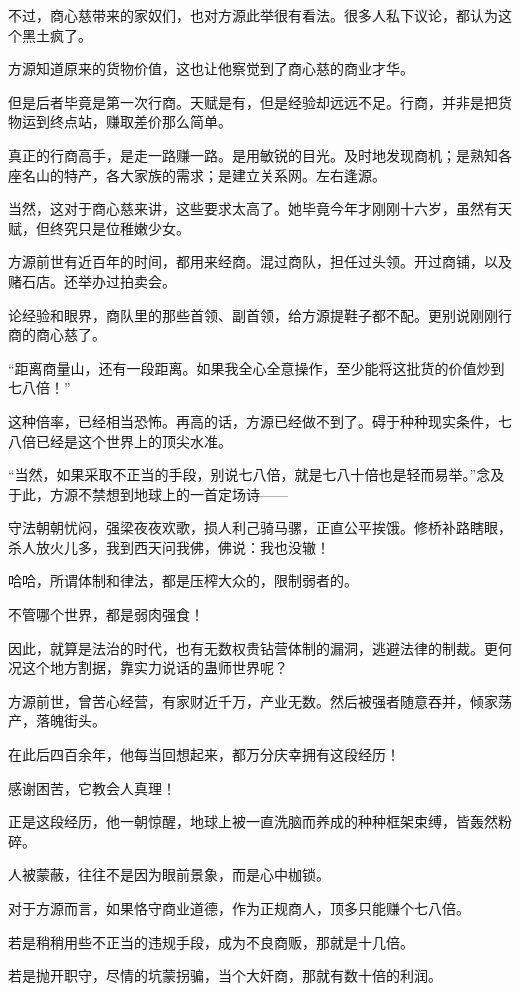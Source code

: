 \begin{this_body}
不过，商心慈带来的家奴们，也对方源此举很有看法。很多人私下议论，都认为这个黑土疯了。

方源知道原来的货物价值，这也让他察觉到了商心慈的商业才华。

但是后者毕竟是第一次行商。天赋是有，但是经验却远远不足。行商，并非是把货物运到终点站，赚取差价那么简单。

真正的行商高手，是走一路赚一路。是用敏锐的目光。及时地发现商机；是熟知各座名山的特产，各大家族的需求；是建立关系网。左右逢源。

当然，这对于商心慈来讲，这些要求太高了。她毕竟今年才刚刚十六岁，虽然有天赋，但终究只是位稚嫩少女。

方源前世有近百年的时间，都用来经商。混过商队，担任过头领。开过商铺，以及赌石店。还举办过拍卖会。

论经验和眼界，商队里的那些首领、副首领，给方源提鞋子都不配。更别说刚刚行商的商心慈了。

“距离商量山，还有一段距离。如果我全心全意操作，至少能将这批货的价值炒到七八倍！”

这种倍率，已经相当恐怖。再高的话，方源已经做不到了。碍于种种现实条件，七八倍已经是这个世界上的顶尖水准。

“当然，如果采取不正当的手段，别说七八倍，就是七八十倍也是轻而易举。”念及于此，方源不禁想到地球上的一首定场诗——

守法朝朝忧闷，强梁夜夜欢歌，损人利己骑马骡，正直公平挨饿。修桥补路瞎眼，杀人放火儿多，我到西天问我佛，佛说：我也没辙！

哈哈，所谓体制和律法，都是压榨大众的，限制弱者的。

不管哪个世界，都是弱肉强食！

因此，就算是法治的时代，也有无数权贵钻营体制的漏洞，逃避法律的制裁。更何况这个地方割据，靠实力说话的蛊师世界呢？

方源前世，曾苦心经营，有家财近千万，产业无数。然后被强者随意吞并，倾家荡产，落魄街头。

在此后四百余年，他每当回想起来，都万分庆幸拥有这段经历！

感谢困苦，它教会人真理！

正是这段经历，他一朝惊醒，地球上被一直洗脑而养成的种种框架束缚，皆轰然粉碎。

人被蒙蔽，往往不是因为眼前景象，而是心中枷锁。

对于方源而言，如果恪守商业道德，作为正规商人，顶多只能赚个七八倍。

若是稍稍用些不正当的违规手段，成为不良商贩，那就是十几倍。

若是抛开职守，尽情的坑蒙拐骗，当个大奸商，那就有数十倍的利润。


\end{this_body}
